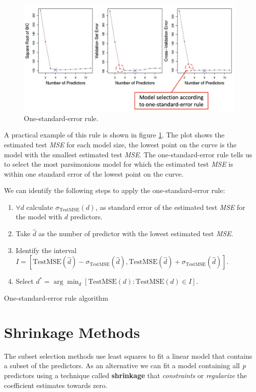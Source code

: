 \begin{figure}
    \centering
    \includegraphics[width=0.8\linewidth]{./figures/chapter_4/onestandarderror.png}
    \caption{One-standard-error rule.}
    \label{fig:lec_15_one_standard_error_rule}
\end{figure}

A practical example of this rule is shown in figure \ref{fig:lec_15_one_standard_error_rule}. The plot shows the estimated test \textit{MSE} for each model size, the lowest point on the curve is the model with the smallest estimated test \textit{MSE}. The one-standard-error rule tells us to select the most parsimonious model for which the estimated test \textit{MSE} is within one standard error of the lowest point on the curve.

We can identify the following steps to apply the one-standard-error rule: %
\begin{algorithm}
    \begin{enumerate}
        \item $\forall d$ calculate $\sigma_{\text{TestMSE}}(d)$, as standard error of the estimated test \textit{MSE} for the model with $d$ predictors.
        \item Take $\hat d$ as the number of predictor with the lowest estimated test \textit{MSE}.
        \item Identify the interval $I = [\text{TestMSE}(\hat d) - \sigma_{\text{TestMSE}}(\hat d), \text{TestMSE}(\hat d) + \sigma_{\text{TestMSE}}(\hat d)]$.
        \item Select $d^\ast = \arg\min_d[\text{TestMSE}(d) : \text{TestMSE}(d) \in I]$.
    \end{enumerate}
    \caption{One-standard-error rule algorithm}
\end{algorithm}


\section{Shrinkage Methods}
The subset selection methods use least squares to fit a linear model that contains a subset of the predictors. As an alternative we can fit a model containing all \textit{p} predictors using a technique called \textbf{shrinkage} that \textit{constraints} or \textit{regularize} the coefficient estimates towards zero.

